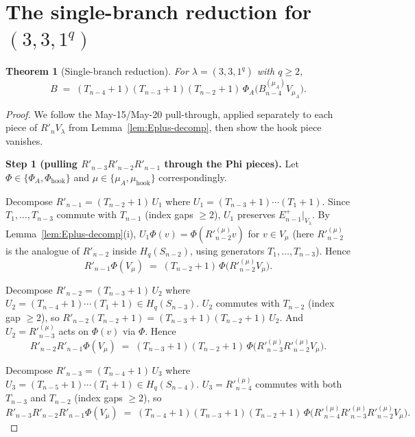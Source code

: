 \documentclass[11pt]{article}
\newtheorem{theorem}{Theorem}
\theoremstyle{definition}
\newcommand{\Hq}{H_q}
\newcommand{\Rp}{{R'}}
\begin{document}
\section{The single-branch reduction for $(3, 3, 1^q)$}\label{sec:reduction}

\begin{theorem}[Single-branch reduction]\label{thm:reduction}
For $\lambda = (3, 3, 1^q)$ with $q \ge 2$,
\begin{equation}\label{eq:reduction}
   B \;=\; (T_{n-4}{+}1)(T_{n-3}{+}1)(T_{n-2}{+}1)\,
   \Phi_A\bigl(B_{n-4}^{(\mu_A)} V_{\mu_A}\bigr).
\end{equation}
\end{theorem}

\begin{proof}
We follow the May-15/May-20 pull-through, applied separately to each
piece of $R'_n V_\lambda$ from Lemma~\ref{lem:Eplus-decomp}, then
show the hook piece vanishes.

\medskip\textbf{Step 1 (pulling $R'_{n-3}R'_{n-2}R'_{n-1}$ through
the Phi pieces).}  Let $\Phi \in \{\Phi_A, \Phi_{\mathrm{hook}}\}$ and
$\mu \in \{\mu_A, \mu_{\mathrm{hook}}\}$ correspondingly.

Decompose $R'_{n-1} = (T_{n-2}+1)\,U_1$ where $U_1 = (T_{n-3}+1)\cdots
(T_1+1)$.  Since $T_1, \ldots, T_{n-3}$ commute with $T_{n-1}$ (index
gaps $\ge 2$), $U_1$ preserves $E_{n-1}^+|_{V_\lambda}$.  By
Lemma~\ref{lem:Eplus-decomp}(i), $U_1 \Phi(v) = \Phi(\Rp_{n-2}^{(\mu)} v)$
for $v \in V_\mu$ (here $\Rp_{n-2}^{(\mu)}$ is the analogue of
$R'_{n-2}$ inside $\Hq(S_{n-2})$, using generators $T_1, \ldots, T_{n-3}$).
Hence
\[
   R'_{n-1} \Phi(V_\mu)
   \;=\; (T_{n-2}+1)\,\Phi\bigl(\Rp_{n-2}^{(\mu)} V_\mu\bigr).
\]

Decompose $R'_{n-2} = (T_{n-3}+1)\,U_2$ where $U_2 = (T_{n-4}+1)\cdots
(T_1+1) \in \Hq(S_{n-3})$.  $U_2$ commutes with $T_{n-2}$ (index gap
$\ge 2$), so
$R'_{n-2}(T_{n-2}+1) = (T_{n-3}+1)(T_{n-2}+1)\,U_2$.  And $U_2 =
\Rp_{n-3}^{(\mu)}$ acts on $\Phi(v)$ via $\Phi$.  Hence
\[
   R'_{n-2}R'_{n-1}\Phi(V_\mu)
   \;=\; (T_{n-3}+1)(T_{n-2}+1)\,\Phi\bigl(\Rp_{n-3}^{(\mu)} \Rp_{n-2}^{(\mu)} V_\mu\bigr).
\]

Decompose $R'_{n-3} = (T_{n-4}+1)\,U_3$ where $U_3 = (T_{n-5}+1)\cdots
(T_1+1) \in \Hq(S_{n-4})$.  $U_3 = \Rp_{n-4}^{(\mu)}$ commutes with
both $T_{n-3}$ and $T_{n-2}$ (index gaps $\ge 2$), so
\begin{equation}\label{eq:branchpull}
   R'_{n-3}R'_{n-2}R'_{n-1}\Phi(V_\mu)
   \;=\; (T_{n-4}+1)(T_{n-3}+1)(T_{n-2}+1)\,
   \Phi\bigl(\Rp_{n-4}^{(\mu)} \Rp_{n-3}^{(\mu)} \Rp_{n-2}^{(\mu)} V_\mu\bigr).
\end{equation}


\end{proof}
\end{document}
